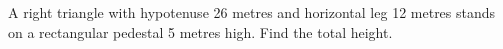 A right triangle with hypotenuse 26 metres and horizontal leg 12 metres stands on a rectangular pedestal 5 metres high. Find the total height.

